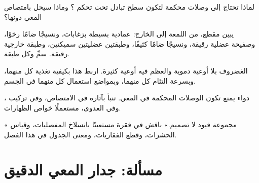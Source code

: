 \begin{exercise}[$\star\star$]\label{exo:b1:body-plans-tissues:8}
لماذا تحتاج  إلى وصلات محكمة لتكون سطح تبادل تحت تحكم ؟ وماذا سيحل بامتصاص المعي دونها؟
\end{exercise}

\begin{exercise}[$\star\star$]\label{exo:b1:body-plans-tissues:9}
يبين مقطع، من اللمعة إلى الخارج:  عمادية بسيطة بزغابات، ونسيجًا
ضامًا رخوًا، وصفيحة عضلية رقيقة، ونسيجًا ضامًا كثيفًا، وطبقتين
عضليتين سميكتين، وطبقة خارجية رقيقة. سمِّ  وكل طبقة.
\end{exercise}

\begin{exercise}[$\star\star\star$]\label{exo:b1:body-plans-tissues:10}
الغضروف بلا أوعية دموية والعظم فيه أوعية كثيرة. اربط هذا بكيفية
تغذية كل منهما، وبسرعة التئام كل منهما، وبمواضع استعمال كل منهما في
الجسم.
\end{exercise}

\begin{exercise}[$\star\star\star$]\label{exo:b1:body-plans-tissues:11}
دواء يمنع تكون الوصلات المحكمة في  المعي. تنبأ بآثاره في
الامتصاص، وفي تركيب ، وفي العدوى، مستعملًا خواص
الظهارات.
\end{exercise}

\begin{exercise}[$\star\star\star$]\label{exo:b1:body-plans-tissues:12}
« مجموعة قيود لا تصميم.» ناقش في فقرة مستعينًا
بانسلاخ المفصليات، وقياس الحشرات، وقطع الفقاريات، ومعنى الجدول في
هذا الفصل.
\end{exercise}

\section{مسألة: جدار المعي الدقيق}

